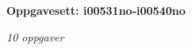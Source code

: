 \centerline{\bf Oppgavesett: i00531no-i00540no}
\vskip 10pt
\centerline{\it 10 oppgaver}\vskip 10pt
\vskip 10pt
